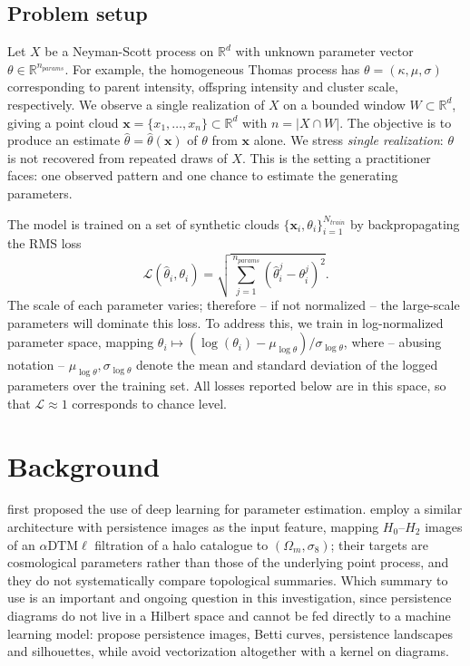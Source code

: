 \documentclass[11pt,a4paper]{article}
\newcommand{\R}{\mathbb{R}}
\newcommand{\pc}{\mathbf{x}}
\begin{document}
\subsection{Problem setup}
\label{ssec:setup}

Let $X$ be a Neyman-Scott process on $\R^d$ with unknown parameter vector
$\theta \in \R^{n_{params}}$. For example, the homogeneous Thomas process has
$\theta = (\kappa, \mu, \sigma)$ corresponding to parent intensity, offspring
intensity and cluster scale, respectively. We observe a single realization of
$X$ on a bounded window $W \subset \R^d$, giving a point cloud
$\pc = \{x_1, \dots, x_n\} \subset \R^d$ with $n = |X \cap W|$. The objective is
to produce an estimate $\hat\theta = \hat\theta(\pc)$ of $\theta$ from $\pc$
alone. We stress \emph{single realization}: $\theta$ is not recovered from
repeated draws of $X$. This is the setting a practitioner faces: one observed
pattern and one chance to estimate the generating parameters.

The model is trained on a set of synthetic clouds
$\{\pc_i, \theta_i\}_{i=1}^{N_{train}}$ by backpropagating the RMS loss
    \[
    \mathcal{L}(\hat\theta_i, \theta_i) = \sqrt{\sum_{j=1}^{n_{params}}(\hat\theta^j_i - \theta^j_i)^2}.
    \]
The scale of each parameter varies; therefore -- if not normalized -- the
large-scale parameters will dominate this loss. To address this, we train in
log-normalized parameter space, mapping
$\theta_i \mapsto (\log(\theta_i) - \mu_{\log\theta})/\sigma_{\log\theta}$,
where -- abusing notation -- $\mu_{\log\theta}, \sigma_{\log\theta}$ denote the
mean and standard deviation of the logged parameters over the training set. All
losses reported below are in this space, so that $\mathcal{L}\approx 1$
corresponds to chance level.

\section{Background}
\label{sec:background}

\citet{vihrs2022neural} first proposed the use of deep learning for parameter
estimation. \citet{yip2025learning} employ a similar architecture with
persistence images as the input feature, mapping $H_0$--$H_2$ images of an
$\alpha\mathrm{DTM}\ell$ filtration of a halo catalogue to
$(\Omega_m,\sigma_8)$; their targets are cosmological parameters rather than
those of the underlying point process, and they do not systematically compare
topological summaries. Which summary to use is an important and ongoing question in this investigation, since
persistence diagrams do not live in a Hilbert space and cannot be fed directly
to a machine learning model: \citet{adams2017persistence} propose persistence
images, \citet{umeda2017time} Betti curves, \citet{bubenik2015landscapes}
persistence landscapes and \citet{chazal2014silhouette} silhouettes, while
\citet{reininghaus2015kernel} avoid vectorization altogether with a kernel on
diagrams.
\end{document}
